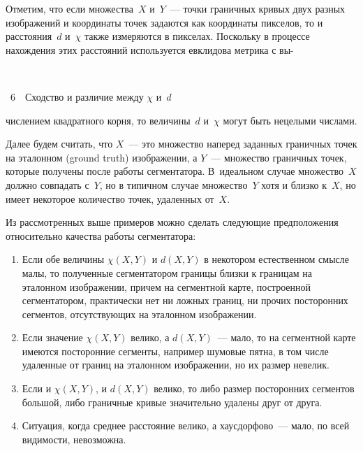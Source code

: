 \begin{multicols}{2}
  Отметим, что если множества~$X$ и~$Y$~--- точки граничных кривых двух 
разных изображений и координаты точек задаются как координаты пикселов, 
то и расстояния~$d$ и~$\chi$ также измеряются в пикселах. Поскольку в 
процессе нахождения этих расстояний используется евклидова метрика с 
вы-\linebreak

\begin{center} %
\vspace*{9pt}
\mbox{%
\epsfxsize=67.361mm
}
\end{center}
\begin{center}
{{\figurename~6}\ \ \small{Сходство и различие между $\chi$ и~$d$}}
\end{center}

\addtocounter{figure}{1}



\noindent
числением квадратного корня, то величины~$d$ и~$\chi$ могут быть 
нецелыми числами.
  
  Далее будем считать, что $X$~--- это множество наперед заданных 
граничных точек на эталонном (ground truth) изображении, а $Y$~--- 
множество граничных точек, которые получены после работы сегментатора. 
В~идеальном случае множество~$X$ должно совпадать с~$Y$, но в типичном 
случае множество~$Y$ хотя и близко к~$X$, но имеет некоторое количество 
точек, удаленных от~$X$.
  
  Из рассмотренных выше примеров можно сделать следующие 
предположения относительно качества работы сегментатора:
  \begin{enumerate}[1.]
  \item  Если обе величины $\chi(X, Y)$ и $d(X, Y)$ в некотором естественном 
смысле малы, то полученные сегментатором границы близки к границам на 
эталонном изображении, причем на сегментной карте, построенной 
сегментатором, практически нет ни ложных границ, ни прочих посторонних 
сегментов, отсутствующих на эталонном изображении.
  \item Если значение $\chi(X, Y)$ велико, а $d(X, Y)$~--- мало, то на 
сегментной карте имеются посторонние сегменты, например шумовые пятна, в 
том числе удаленные от границ на эталонном изображении, но их размер 
невелик.
  \item  Если и $\chi(X, Y)$, и $d(X, Y)$ велико, то либо размер посторонних 
сегментов большой, либо граничные кривые значительно удалены друг от 
друга.
  \item Ситуация, когда среднее расстояние велико, а хаусдорфово~--- мало, по 
всей видимости, невозможна.
  \end{enumerate}
  

\end{multicols}
